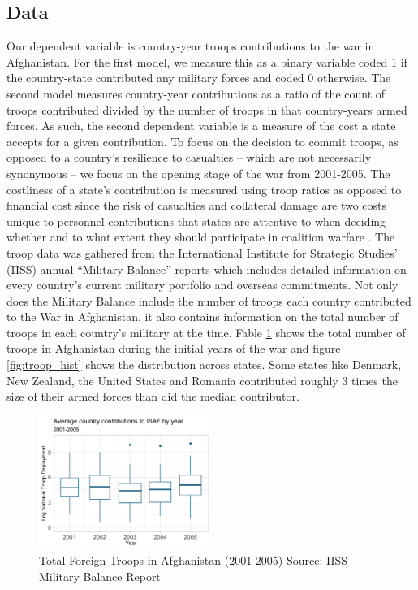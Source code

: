 \documentclass[12pt,letterpaper]{article}
\begin{document}
	\subsection{Data}
		Our dependent variable is country-year troops contributions to the war in Afghanistan. For the first model, we measure this as a binary variable coded 1 if the country-state contributed any military forces and coded 0 otherwise. The second model measures country-year contributions as a ratio of the count of troops contributed divided by the number of troops in that country-years armed forces. As such, the second dependent variable is a measure of the cost a state accepts for a given contribution. To focus on the decision to commit troops, as opposed to a country's resilience to casualties -- which are not necessarily synonymous -- we focus on the opening stage of the war from 2001-2005. The costliness of a state's contribution is measured using troop ratios as opposed to financial cost since the risk of casualties and collateral damage are two costs unique to personnel contributions that states are attentive to when deciding whether and to what extent they should participate in coalition warfare \citep{ringsmose_natoburdensharingredux_2010, chivvis_topplingqaddafilibya_2014, haesebrouck_natoburdensharing_2017}. The troop data was gathered from the International Institute for Strategic Studies' (IISS) annual ``Military Balance'' reports \citep{internationalinstituteforstrategicstudies_militarybalance_2002} which includes detailed information on every country's current military portfolio and overseas commitments. Not only does the Military Balance include the number of troops each country contributed to the War in Afghanistan, it also contains information on the total number of troops in each country's military at the time. Fable \ref{fig:afghan_total} shows the total number of troops in Afghanistan during the initial years of the war and figure \ref{fig:troop_hist} shows the distribution across states. Some states like Denmark, New Zealand, the United States and Romania contributed roughly 3 times the size of their armed forces than did the median contributor.

			\begin{figure}[H]
			\centering
				\includegraphics[width=0.5\textwidth]{country_troop_boxplot.png}
			\caption{Total Foreign Troops in Afghanistan (2001-2005) Source: IISS Military Balance Report}
			\label{fig:afghan_total}
			\end{figure}
\end{document}
